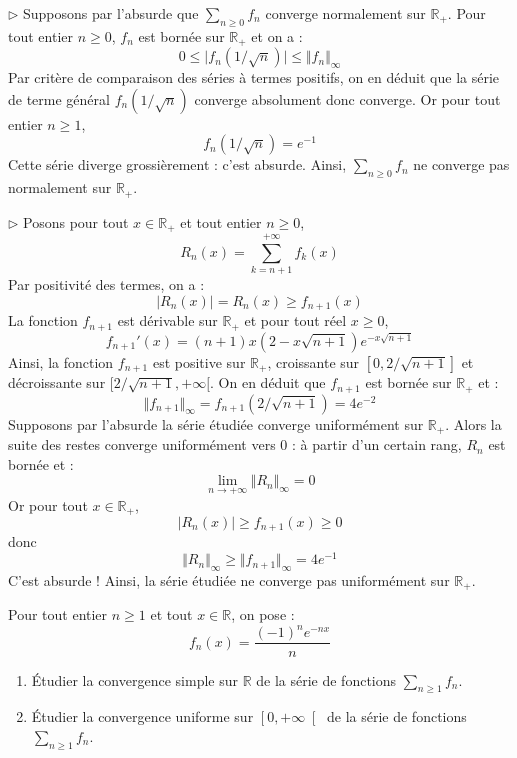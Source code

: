 \documentclass[a4paper,twoside,french,11pt]{VcCours}
\newcommand{\Sum}[2]{\sum_{#1}^{#2}}
\begin{document}
\medskip

$\rhd$ Supposons par l'absurde que $\Sum{n\geq 0}{} f_n$ converge normalement sur $\mathbb{R}_+$. Pour tout entier $n \geq 0$, $f_n$ est bornée sur $\mathbb{R}_+$ et on a :
$$ 0 \leq \vert f_n(1/\sqrt{n}) \vert \leq \Vert f_n \Vert_{\infty}$$
Par critère de comparaison des séries à termes positifs, on en déduit que la série de terme général $f_n(1/\sqrt{n})$ converge absolument donc converge. Or pour tout entier $n \geq 1$,
 $$ f_n(1/\sqrt{n}) = e^{-1}$$
Cette série diverge grossièrement : c'est absurde. Ainsi, $\Sum{n\geq 0}{} f_n$ ne converge pas normalement sur $\mathbb{R}_+$.

\medskip

$\rhd$ Posons pour tout $x \in \mathbb{R}_+$ et tout entier $n \geq 0$,
$$ R_n(x) = \sum_{k=n+1}^{+ \infty} f_k(x)$$
Par positivité des termes, on a :
$$ \vert R_n(x) \vert = R_n(x) \geq f_{n+1}(x)$$
La fonction $f_{n+1}$ est dérivable sur $\mathbb{R}_+$ et pour tout réel $x \geq 0$,
$$ f_{n+1}'(x) = (n+1)x (2-x \sqrt{n+1})e^{-x \sqrt{n+1}}$$
Ainsi, la fonction $f_{n+1}$ est positive sur $\mathbb{R}_+$, croissante sur $[0, 2/ \sqrt{n+1}]$ et décroissante sur $[2/\sqrt{n+1}, + \infty[$. On en déduit que $f_{n+1}$ est bornée sur $\mathbb{R}_+$ et :
$$ \Vert f_{n+1} \Vert_{\infty} = f_{n+1}(2/\sqrt{n+1}) = 4 e^{-2}$$
Supposons par l'absurde la série étudiée converge uniformément sur $\mathbb{R}_+$. Alors la suite des restes converge uniformément vers $0$ : à partir d'un certain rang, $R_n$ est bornée et :
$$ \lim_{n \rightarrow + \infty} \Vert R_n \Vert_{ \infty} = 0$$
Or pour tout $x \in \mathbb{R}_+$,
$$  \vert R_n(x) \vert \geq f_{n+1}(x) \geq 0$$
donc 
$$ \Vert R_n \Vert_{\infty} \geq \Vert f_{n+1} \Vert_{\infty} = 4 e^{-1}$$
C'est absurde ! Ainsi, la série étudiée ne converge pas uniformément sur $\mathbb{R}_+$.


\begin{Exercice}{} Pour tout entier $n \geq 1$ et tout $x \in \mathbb{R}$, on pose :
$$ f_n(x) = \dfrac{\left(-1\right)^{n}e^{-nx}}{n} $$

\begin{enumerate}
\item \'Etudier la convergence simple sur $\mathbb{R}$  de la série de fonctions $\Sum{n\geq 1}{} f_n.$
\item \'Etudier la convergence uniforme sur $\left[ 0,+\infty\right[ $  de la série de fonctions $\Sum{n\geq 1}{} f_n.$
\end{enumerate}
\end{Exercice}
\end{document}
